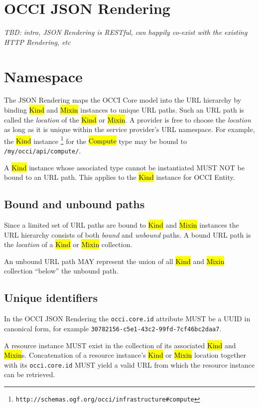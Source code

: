 \documentclass[10pt,a4paper]{article}
\begin{document}
\section{OCCI JSON Rendering}
{\em TBD: intro, JSON Rendering is RESTful, can happily co-exist with the
existing HTTP Rendering, etc}

\section{Namespace}

The JSON Rendering maps the OCCI Core model into the URL hierarchy by binding
\hl{Kind} and \hl{Mixin} instances to unique URL paths. Such an URL path is called
the {\em location} of the \hl{Kind} or \hl{Mixin}.
A provider is free to choose the {\em location} as long as it is unique
within the service provider's URL namespace.
For example, the \hl{Kind} instance%
\footnote{\tt http://schemas.ogf.org/occi/infrastructure\#compute}
for the \hl{Compute} type may be bound to {\tt /my/occi/api/compute/}.

A \hl{Kind} instance whose associated type cannot be instantiated MUST NOT be
bound to an URL path. This applies to the \hl{Kind} instance for OCCI Entity.

\subsection{Bound and unbound paths}

Since a limited set of URL paths are bound to \hl{Kind} and \hl{Mixin}
instances the URL hierarchy consists of both {\em bound} and {\em unbound}
paths.
A bound URL path is the {\em location} of a \hl{Kind} or \hl{Mixin} collection.

An unbound URL path MAY represent the union of all \hl{Kind} and \hl{Mixin}
collection ``below'' the unbound path.

\subsection{Unique identifiers}

In the OCCI JSON Rendering the {\tt occi.core.id} attribute MUST be a UUID
\cite{rfc4122} in canonical form, for example {\tt 30782156-c5e1-43c2-99fd-7cf46bc2daa7}.

A resource instance MUST exist in the collection of its associated \hl{Kind}
and \hl{Mixin}s. Concatenation of a resource instance's \hl{Kind} or \hl{Mixin}
location together with its {\tt occi.core.id} MUST yield a valid URL from which
the resource instance can be retrieved.
\end{document}
